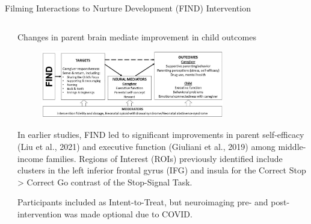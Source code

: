 \documentclass[final]{beamer}
\begin{document}
\begin{frame}[t]
\begin{columns}[t]
\begin{column}{\textwidth}
\begin{block}{Filming Interactions to Nurture Development (FIND) Intervention}
\begin{columns}[t]
\begin{column}{0.48\textwidth}
      \end{column}

      \begin{column}{0.48\textwidth}
              \vspace{-0.4cm}  %
    \begin{block}{Changes in parent brain mediate improvement in child outcomes}
        \begin{figure}[ht]
          \centering
          \includegraphics[clip, width=0.75\textwidth]{model.png}
          \label{fig:model}
        \end{figure}
        \vspace{-0.25cm}
        In earlier studies, FIND led to significant improvements in parent self-efficacy (Liu et al., 2021) and executive function (Giuliani et al., 2019) among middle-income families. 
        Regions of Interest (ROIs) previously identified include clusters in the left inferior frontal gyrus (IFG) and insula for the Correct Stop > Correct Go contrast of the Stop-Signal Task.
        \end{block}

    \begin{block}{Participants included as Intent-to-Treat, but neuroimaging pre- and post-intervention was made optional due to COVID.}

\end{block}
\end{column}
\end{columns}
\end{block}
\end{column}
\end{columns}
\end{frame}
\end{document}
